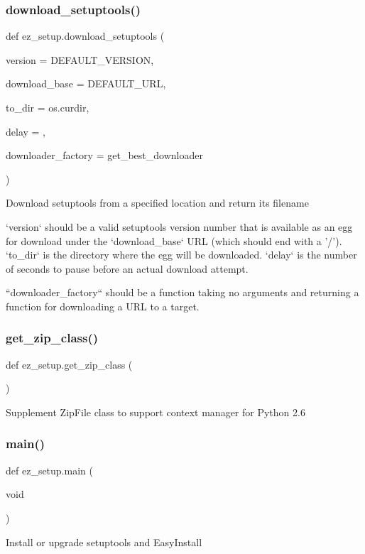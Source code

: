 \subsubsection{\texorpdfstring{download\+\_\+setuptools()}{download\_setuptools()}}
{\footnotesize\ttfamily def ez\+\_\+setup.\+download\+\_\+setuptools (\begin{DoxyParamCaption}\item[{}]{version = {\ttfamily DEFAULT\+\_\+VERSION},  }\item[{}]{download\+\_\+base = {\ttfamily DEFAULT\+\_\+URL},  }\item[{}]{to\+\_\+dir = {\ttfamily os.curdir},  }\item[{}]{delay = {},  }\item[{}]{downloader\+\_\+factory = {\ttfamily get\+\_\+best\+\_\+downloader} }\end{DoxyParamCaption})}

\begin{DoxyVerb}Download setuptools from a specified location and return its filename

`version` should be a valid setuptools version number that is available
as an egg for download under the `download_base` URL (which should end
with a '/'). `to_dir` is the directory where the egg will be downloaded.
`delay` is the number of seconds to pause before an actual download
attempt.

``downloader_factory`` should be a function taking no arguments and
returning a function for downloading a URL to a target.
\end{DoxyVerb}
 \mbox{\label{namespaceez__setup_a61495793b812c47ba054dd058fa4ba0e}} 
\subsubsection{\texorpdfstring{get\+\_\+zip\+\_\+class()}{get\_zip\_class()}}
{\footnotesize\ttfamily def ez\+\_\+setup.\+get\+\_\+zip\+\_\+class (\begin{DoxyParamCaption}{ }\end{DoxyParamCaption})}

\begin{DoxyVerb}Supplement ZipFile class to support context manager for Python 2.6
\end{DoxyVerb}
 \mbox{\label{namespaceez__setup_abc81dbe1d4caae0b1729c17a6914882e}} 
\subsubsection{\texorpdfstring{main()}{main()}}
{\footnotesize\ttfamily def ez\+\_\+setup.\+main (\begin{DoxyParamCaption}\item[{void}]{ }\end{DoxyParamCaption})}

\begin{DoxyVerb}Install or upgrade setuptools and EasyInstall\end{DoxyVerb}
 